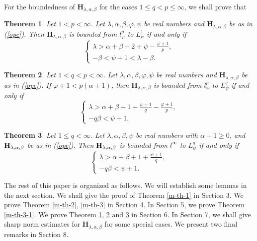 \documentclass[10pt]{amsart}
\newtheorem{theorem}{Theorem}[section]
\theoremstyle{definition}    %
\numberwithin{equation}{section}
\begin{document}
For the boundedness of $\mathbf{H}_{\lambda, \alpha, \beta}$ for the cases $1\leq q<p\leq \infty$, we shall prove that  

\begin{theorem}\label{th-r-10}
Let $1<p<\infty$. Let $\lambda, \alpha, \beta, \varphi, \psi$ be real numbers and $\mathbf{H}_{\lambda, \alpha, \beta}$ be as in (\ref{ope}).  Then  $\mathbf{H}_{\lambda, \alpha, \beta}$ is bounded from
$l_{\varphi}^p$ to $L_{\psi}^1$ if and only if 
\begin{equation} 
\begin{cases}
\lambda>\alpha+\beta+2+\psi-\frac{\varphi+1}{p}, \\
-\beta<\psi+1<\lambda-\beta. \nonumber 
\end{cases}
\end{equation}
\end{theorem}

\begin{theorem}\label{th-r-1}
Let $1<q<p<\infty$. Let $\lambda, \alpha, \beta, \varphi, \psi$ be real numbers and $\mathbf{H}_{\lambda, \alpha, \beta}$ be as in (\ref{ope}). If $\varphi+1<p(\alpha+1)$, then $\mathbf{H}_{\lambda, \alpha, \beta}$ is bounded from
$l_{\varphi}^p$ to $L_{\psi}^q$ if and only if 
\begin{equation} 
\begin{cases}
\lambda>\alpha+\beta+1+\frac{\psi+1}{q}-\frac{\varphi+1}{p}, \\
-q\beta<\psi+1. \nonumber 
\end{cases}
\end{equation}
\end{theorem}

\begin{theorem}\label{th-r-2}
Let $1\leq q<\infty$. Let $\lambda, \alpha, \beta, \psi$ be real numbers with $\alpha+1\geq0$, and ${\bf H}_{\lambda, \alpha, \beta}$ be as in (\ref{ope}).
Then ${\bf H}_{\lambda, \alpha, \beta}$ is bounded from $l^{\infty}$ to $L_{\psi}^{q}$ if and only if
\begin{equation} 
\begin{cases}
\lambda>\alpha+\beta+1+\frac{\psi+1}{q}, \\
-q\beta<\psi+1. \nonumber 
\end{cases}
\end{equation}
\end{theorem}

The rest of this paper is organized as follows.  We will establish some lemmas in the next section. We shall give the proof of Theorem \ref{m-th-1} in Section 3. We prove Theorem \ref{m-th-2}, \ref{m-th-3} in Section 4.  In Section 5, we prove Theorem \ref{m-th-3-1}.  We prove Theorem \ref{th-r-10}, \ref{th-r-1} and \ref{th-r-2} in Section 6. In Section 7, we shall give sharp norm estimates for $\mathbf{H}_{\lambda, \alpha, \beta}$ for some special cases.
We present two final remarks in Section 8.
\end{document}
